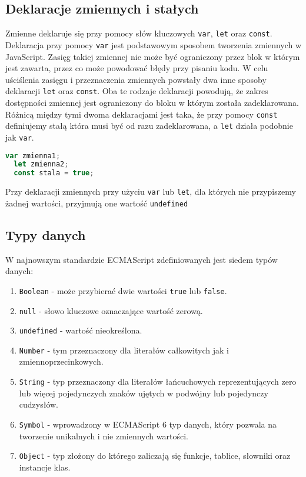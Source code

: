 \subsection{Deklaracje zmiennych i stałych}
\par Zmienne deklaruje się przy pomocy słów kluczowych \texttt{var}, \texttt{let} oraz \texttt{const}. Deklaracja przy pomocy \texttt{var} jest podstawowym sposobem tworzenia zmiennych w JavaScript. Zasięg takiej zmiennej nie może być ograniczony przez blok w którym jest zawarta, przez co może powodować błędy przy pisaniu kodu. W celu uściślenia zasięgu i przeznaczenia zmiennych powstały dwa inne sposoby deklaracji \texttt{let} oraz \texttt{const}. Oba te rodzaje deklaracji powodują, że zakres dostępności zmiennej jest ograniczony do bloku w którym została zadeklarowana. Różnicą między tymi dwoma deklaracjami jest taka, że przy pomocy \texttt{const} definiujemy stałą która musi być od razu zadeklarowana, a \texttt{let} działa podobnie jak \texttt{var}.
\begin{lstlisting}[language=JavaScript, caption=Przykład deklaracji zmiennych, label=alg:deklaracjaZmiennej1]
  var zmienna1;
  let zmienna2;
  const stala = true;
\end{lstlisting}
\par Przy deklaracji zmiennych przy użyciu \texttt{var} lub \texttt{let}, dla których nie przypiszemy żadnej wartości, przyjmują one wartość \texttt{undefined}

\subsection{Typy danych}
\par W najnowszym standardzie ECMAScript zdefiniowanych jest siedem typów danych:
\begin{enumerate}
  \item \texttt{Boolean} - może przybierać dwie wartości \texttt{true} lub \texttt{false}.
  \item \texttt{null} - słowo kluczowe oznaczające wartość zerową. 
  \item \texttt{undefined} - wartość nieokreślona.
  \item \texttt{Number} - tym przeznaczony dla literałów całkowitych jak i zmiennoprzecinkowych.
  \item \texttt{String} - typ przeznaczony dla literałów łańcuchowych reprezentujących zero lub więcej pojedynczych znaków ujętych w podwójny lub pojedynczy cudzysłów.
  \item \texttt{Symbol} - wprowadzony w ECMAScript 6 typ danych, który pozwala na tworzenie unikalnych i nie zmiennych wartości.
  \item \texttt{Object} - typ złożony do którego zaliczają się funkcje, tablice, słowniki oraz instancje klas.
\end{enumerate}

